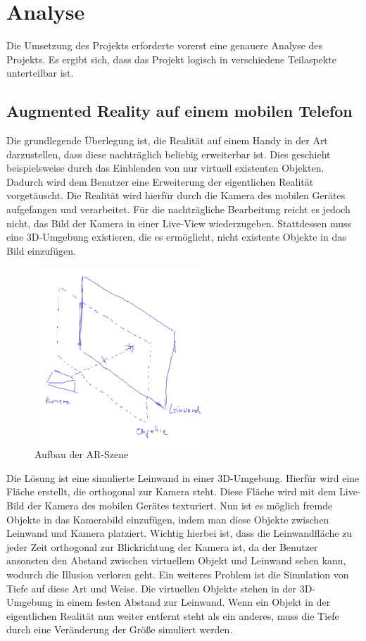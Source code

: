 \chapter{Analyse}
Die Umsetzung des Projekts erforderte vorerst eine genauere Analyse des Projekts. Es ergibt sich, dass das Projekt logisch in verschiedene Teilaspekte unterteilbar ist.

\section{Augmented Reality auf einem mobilen Telefon}
Die grundlegende Überlegung ist, die Realität auf einem Handy in der Art darzustellen, dass diese nachträglich beliebig erweiterbar ist. Dies geschieht beispielsweise durch das Einblenden von nur virtuell existenten Objekten. Dadurch wird dem Benutzer eine Erweiterung der eigentlichen Realität vorgetäuscht.
Die Realität wird hierfür durch die Kamera des mobilen Gerätes aufgefangen und verarbeitet. Für die nachträgliche Bearbeitung reicht es jedoch nicht, das Bild der Kamera in einer Live-View wiederzugeben. Stattdessen muss eine 3D-Umgebung existieren, die es ermöglicht, nicht existente Objekte in das Bild einzufügen.

\begin{figure}[!h]
  \centering
    \includegraphics[width=6.5cm]{graphics/szene_skizze}
    \caption{Aufbau der AR-Szene}
    \label{fig:scene_sketch}
\end{figure}

Die Lösung ist eine simulierte Leinwand in einer 3D-Umgebung. Hierfür wird eine Fläche erstellt, die orthogonal zur Kamera steht. Diese Fläche wird mit dem Live-Bild der Kamera des mobilen Gerätes texturiert. Nun ist es möglich fremde Objekte in das Kamerabild einzufügen, indem man diese Objekte zwischen Leinwand und Kamera platziert.
Wichtig hierbei ist, dass die Leinwandfläche zu jeder Zeit orthogonal zur Blickrichtung der Kamera ist, da der Benutzer ansonsten den Abstand zwischen virtuellem Objekt und Leinwand sehen kann, wodurch die Illusion verloren geht. Ein weiteres Problem ist die Simulation von Tiefe auf diese Art und Weise. Die virtuellen Objekte stehen in der 3D-Umgebung in einem festen Abstand zur Leinwand. Wenn ein Objekt in der eigentlichen Realität nun weiter entfernt steht als ein anderes, muss die Tiefe durch eine Veränderung der Größe simuliert werden.

